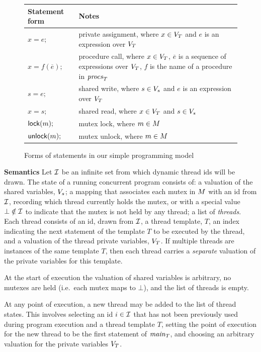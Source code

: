 \begin{figure}
\begin{tabular}{lp{5.5cm}}
\textbf{Statement form} & \textbf{Notes} \\\hline
$x = e;$ & private assignment, where $x \in V_{T}$ and $e$ is an expression over $V_{T}$ \\\hline
$x = f(\overline{e});$ & procedure call, where $x \in V_{T}$, $\overline{e}$ is a sequence of expressions over $V_{T}$, $f$ is the name of a procedure in $\mathit{procs}_{T}$ \\\hline
$s = e;$ & shared write, where $s \in V_s$ and $e$ is an expression over $V_{T}$ \\\hline
$x = s;$ & shared read,  where $x \in V_{T}$ and $s \in V_s$ \\\hline
$\mathsf{lock}(m);$   & mutex lock, where $m \in M$ \\\hline
$\mathsf{unlock}(m);$ & mutex unlock, where $m \in M$
\end{tabular}
\caption{Forms of statements in our simple programming model}\label{fig:statements}
\end{figure}

\medskip\noindent\textbf{Semantics} Let $\mathcal{I}$ be an infinite set from
which dynamic thread ids will be drawn.  The state of a running
concurrent program consists of: a valuation of the shared variables,
$V_s$; a mapping that associates each mutex in $M$ with
an id from $\mathcal{I}$, recording which thread currently holds the mutex,
or with a special value $\bot \notin \mathcal{I}$ to indicate that the
mutex is not held by any thread; a list of \emph{threads}.  Each
thread consists of an id, drawn from $\mathcal{I}$, a thread template, $T$,
an index indicating the next statement of the template $T$ to be
executed by the thread, and a valuation of the thread private
variables, $V_{T}$.  If multiple threads are instances of the
same template $T$, then each thread carries a \emph{separate}
valuation of the private variables for this template.

At the start of execution the valuation of shared variables is
arbitrary, no mutexes are held (i.e.\ each mutex maps to $\bot$),
and the list of threads is empty.

At any point of execution, a new thread may be added to the list of
thread states.  This involves selecting an id $i \in \mathcal{I}$ that has
not been previously used during program execution and a thread
template $T$, setting the point of execution for the new thread to be
the first statement of $\mathit{main}_{T}$, and choosing an arbitrary
valuation for the private variables $V_{T}$.

